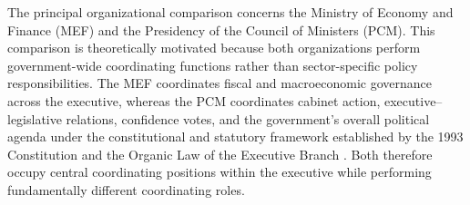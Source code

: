 \documentclass[doc, 12pt, a4paper,floatsintext]{apa7}
\begin{document}
% 
% 
% 
% 

The principal organizational comparison concerns the Ministry of Economy and Finance (MEF) and the Presidency of the Council of Ministers (PCM). This comparison is theoretically motivated because both organizations perform government-wide coordinating functions rather than sector-specific policy responsibilities. The MEF coordinates fiscal and macroeconomic governance across the executive, whereas the PCM coordinates cabinet action, executive--legislative relations, confidence votes, and the government's overall political agenda under the constitutional and statutory framework established by the 1993 Constitution and the Organic Law of the Executive Branch \parencite[Arts.~122--127]{peru_constitucion_1993,peru_ley_2007}. Both therefore occupy central coordinating positions within the executive while performing fundamentally different coordinating roles.
\end{document}
